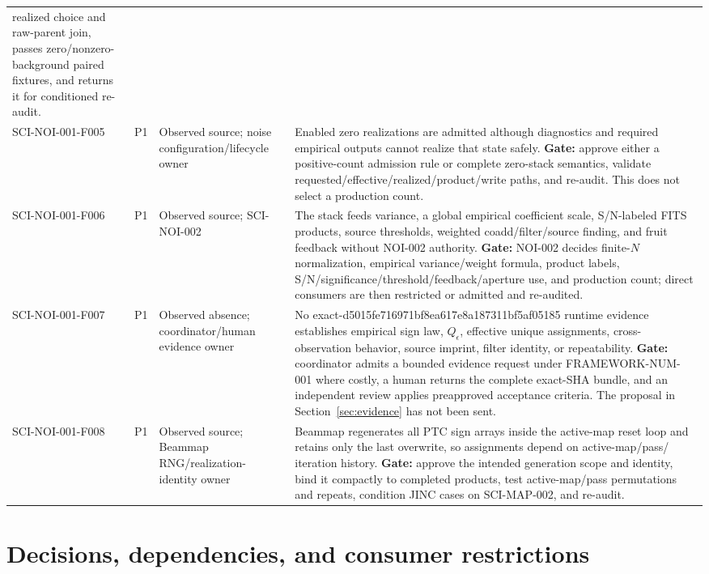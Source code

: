 \documentclass[10pt]{article}
\newcommand{\appsha}{d5015fe716971bf8ea617e8a187311bf5af05185}
\begin{document}
\begin{longtable}{@{}p{}p{}p{}p{}@{}}
realized choice and raw-parent join, passes zero/nonzero-background paired
fixtures, and returns it for conditioned re-audit. \\
SCI-NOI-001-F005 & P1 &
Observed source; noise configuration/lifecycle owner &
Enabled zero realizations are admitted although diagnostics and required
empirical outputs cannot realize that state safely.  \textbf{Gate:} approve
either a positive-count admission rule or complete zero-stack semantics,
validate requested/effective/realized/product/write paths, and re-audit.  This
does not select a production count. \\
SCI-NOI-001-F006 & P1 &
Observed source; SCI-NOI-002 &
The stack feeds variance, a global empirical coefficient scale, S/N-labeled
FITS products, source thresholds, weighted coadd/filter/source finding, and
fruit feedback without NOI-002 authority.  \textbf{Gate:} NOI-002 decides
finite-$N$ normalization, empirical variance/weight formula, product labels,
S/N/significance/threshold/feedback/aperture use, and production count; direct
consumers are then restricted or admitted and re-audited. \\
SCI-NOI-001-F007 & P1 &
Observed absence; coordinator/human evidence owner &
No exact-\appsha{} runtime evidence establishes empirical sign law,
$Q_\epsilon$, effective unique assignments, cross-observation behavior,
source imprint, filter identity, or repeatability.  \textbf{Gate:} coordinator
admits a bounded evidence request under FRAMEWORK-NUM-001 where costly, a
human returns the complete exact-SHA bundle, and an independent review applies
preapproved acceptance criteria.  The proposal in Section~\ref{sec:evidence}
has not been sent. \\
SCI-NOI-001-F008 & P1 &
Observed source; Beammap RNG/realization-identity owner &
Beammap regenerates all PTC sign arrays inside the active-map reset loop and
retains only the last overwrite, so assignments depend on active-map/pass/
iteration history.  \textbf{Gate:} approve the intended generation scope and
identity, bind it compactly to completed products, test active-map/pass
permutations and repeats, condition JINC cases on SCI-MAP-002, and re-audit. \\
\bottomrule
\end{longtable}

\section{Decisions, dependencies, and consumer restrictions}
\label{sec:decisions}
\end{document}
